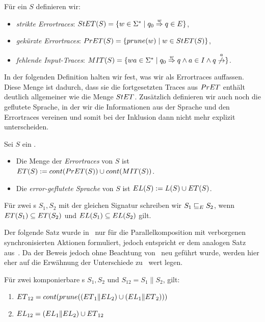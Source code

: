 \begin{Def}[Errortraces]
  \label{DefErrortraces}
  Für ein \EIO{} $S$ definieren wir:
  \begin{itemize}
    \item \emph{strikte Errortraces}: $StET{}(S)=\{w\in\Sigma
      ^*\mid q_0\overset{w}{\Rightarrow}q\in E\}$,
    \item \emph{gekürzte Errortraces}: $PrET{}(S)=\{prune{}(w)\mid w\in StET{}(S)\}$,
    \item \emph{fehlende Input-Traces}: $\MIT{}(S)=\{wa\in\Sigma ^*\mid
      q_0\overset{w}{\Rightarrow}q\wedge a\in I\wedge
    q\overset{a}{\not{\hspace{-0.1cm}\rightarrow}}\}$.
  \end{itemize}
\end{Def}

In der folgenden Definition halten wir fest, was wir als Errortraces auffassen.
Diese Menge ist dadurch, dass sie die fortgesetzten Traces aus $PrET{}$ enthält
deutlich allgemeiner wie die Menge $StET{}$. Zusätzlich definieren wir auch noch
die geflutete Sprache, in der wir die Informationen aus der Sprache und den
Errortraces vereinen und somit bei der Inklusion dann nicht mehr explizit
unterscheiden.

\begin{Def}
  \label{DefETEL}
  Sei $S$ ein \EIO{}.
  \begin{itemize}
    \item Die Menge der \emph{Errortraces} von $S$ ist $ET{}(S):=cont{}(PrET{}(S))\cup
      cont{}(MIT{}(S))$.
    \item Die \emph{error-geflutete Sprache} von $S$ ist $EL{}(S):=L(S)\cup ET{}(S)$.
  \end{itemize}
  Für zwei \EIO{}s $S_1, S_2$ mit der gleichen Signatur schreiben wir
  $S_1\sqsubseteq _E S_2$, wenn $ET{}(S_1)\subseteq ET{}(S_2)$ und
  $EL{}(S_1)\subseteq EL{}(S_2)$ gilt.
\end{Def}

Der folgende Satz wurde in~\cite{Vogler2014EIO} nur für die Parallelkomposition
mit verborgenen synchronisierten Aktionen formuliert, jedoch entspricht er dem
analogen Satz aus~\cite{Schlosser2012BA}. Da der Beweis jedoch ohne Beachtung
von~\cite{Schlosser2012BA} neu geführt wurde, werden hier eher auf die
Erwähnung der Unterschiede zu~\cite{Vogler2014EIO} wert legen.

\begin{satz}
  \label{satzErrorSemanik}
  Für zwei komponierbare \EIO{}s $S_1, S_2$ und $S_{12}=S_1\|S_2$, gilt:
  \begin{enumerate}
    \item $ET{}_{12}=cont{}(prune{}((ET{}_1\|EL{}_2)\cup(EL{}_1\|ET{}_2)))$
    \item $EL{}_{12}=(EL{}_1\|EL{}_2)\cup ET{}_{12}$
  \end{enumerate}
\end{satz}

